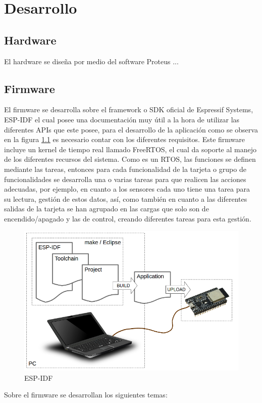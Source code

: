 \chapter{Desarrollo}

\section{Hardware}

El hardware se diseña por medio del software Proteus ...

\section{Firmware}

El firmware se desarrolla sobre el framework o SDK oficial de Espressif Systems, ESP-IDF el cual posee una documentación \cite{ES} muy útil a la hora de utilizar las diferentes APIs que este posee, para el desarrollo de la aplicación como se observa en la figura \ref{fig:what-you-need} es necesario contar con los diferentes requisitos. Este firmware incluye un kernel de tiempo real llamado FreeRTOS, el cual da soporte al manejo de los diferentes recursos del sistema. Como es un RTOS, las funciones se definen mediante las tareas, entonces para cada funcionalidad de la tarjeta o grupo de funcionalidades se desarrolla una o varias tareas para que realicen las acciones adecuadas, por ejemplo, en cuanto a los sensores cada uno tiene una tarea para su lectura, gestión de estos datos, así, como también en cuanto a las diferentes salidas de la tarjeta se han agrupado en las cargas que solo son de encendido/apagado y las de control, creando diferentes tareas para esta gestión.\\

\begin{figure}[H]
	\centering
	\caption{ESP-IDF \cite{ES}}
	\label{fig:what-you-need}
	\includegraphics[width=0.5\linewidth]{Imagenes/what-you-need}
\end{figure}


Sobre el firmware se desarrollan los siguientes temas:

